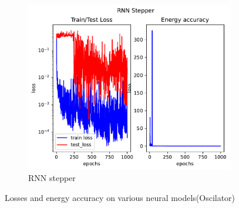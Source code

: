 \begin{figure}[H]
\begin{subfigure}[b]{0.3\textwidth}
		\includegraphics[width=\textwidth]{chapters/chapter5/body2_rne_loss.pdf}
		\caption{RNN stepper}
	\end{subfigure}
	
	\caption{Losses and energy accuracy on various neural models(Oscilator)}
	\label{body2_loss}
\end{figure}


